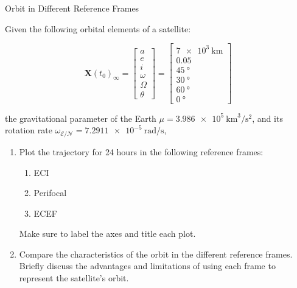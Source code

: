 \begin{hwkProblem}{2}{Orbit in Different Reference Frames} \label{hwk:p02}

	Given the following orbital elements of a satellite:

	\[
		\boldsymbol{X}\left(t_0\right)_{\infty}=\left[\begin{array}{c}
				a      \\
				e      \\
				i      \\
				\omega \\
				\Omega \\
				\theta
			\end{array}\right]=\left[\begin{array}{cc}
				\qty{7e3}{\km}    \\
				0.05              \\
				\qty{45}{\degree} \\
				\qty{30}{\degree} \\
				\qty{60}{\degree} \\
				\qty{0}{\degree}
			\end{array}\right]
	\]

	the gravitational parameter of the Earth \( \mu = \qty{3.986e5}{\km\cubed \per \s\squared} \), and its rotation rate \( \omega_{\mathcal{E}/\mathcal{N}}= \qty{7.2911e-5}{\radian\per\s} \),

	\begin{enumerate}[label=(\alph*)]
		\item \label{hwk:p02a} Plot the trajectory for 24 hours in the following reference frames:
		      \begin{enumerate}[label=(\arabic*)]
			      \item \label{hwk:p02a1} ECI
			      \item \label{hwk:p02a2} Perifocal
			      \item \label{hwk:p02a3} ECEF
		      \end{enumerate}
		      Make sure to label the axes and title each plot.
		\item \label{hwk:p02b} Compare the characteristics of the orbit in the different reference frames. Briefly discuss the advantages and limitations of using each frame to represent the satellite’s orbit.
	\end{enumerate}

	\hwkSol{} \label{hwk:s02}

	\hwkPart{} \label{hwk:s02a}


\end{hwkProblem}
